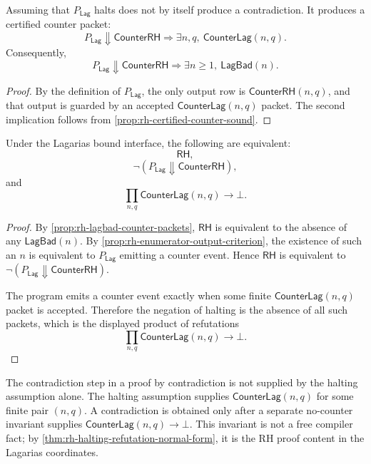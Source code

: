 \begin{proposition}
\label{prop:rh-halting-assumption-exposes-counter}
Assuming that $P_{\mathsf{Lag}}$ halts does not by itself produce a
contradiction.  It produces a certified counter packet:
$$
P_{\mathsf{Lag}}\Downarrow\mathsf{CounterRH}
\Longrightarrow
\exists n,q,\ \mathsf{CounterLag}(n,q).
$$
Consequently,
$$
P_{\mathsf{Lag}}\Downarrow\mathsf{CounterRH}
\Longrightarrow
\exists n\geq 1,\ \mathsf{LagBad}(n).
$$
\end{proposition}

\begin{proof}
By the definition of $P_{\mathsf{Lag}}$, the only output row is
$\mathsf{CounterRH}(n,q)$, and that output is guarded by an accepted
$\mathsf{CounterLag}(n,q)$ packet.  The second implication follows from
\autoref{prop:rh-certified-counter-sound}.
\end{proof}

\begin{theorem}
\label{thm:rh-halting-refutation-normal-form}
Under the Lagarias bound interface, the following are equivalent:
$$
\mathsf{RH},
$$
$$
\neg(P_{\mathsf{Lag}}\Downarrow\mathsf{CounterRH}),
$$
and
$$
\prod_{n,q}\mathsf{CounterLag}(n,q)\to\bot.
$$
\end{theorem}

\begin{proof}
By \autoref{prop:rh-lagbad-counter-packets}, $\mathsf{RH}$ is equivalent to
the absence of any $\mathsf{LagBad}(n)$.  By
\autoref{prop:rh-enumerator-output-criterion}, the existence of such an
$n$ is equivalent to $P_{\mathsf{Lag}}$ emitting a counter event.  Hence
$\mathsf{RH}$ is equivalent to
$\neg(P_{\mathsf{Lag}}\Downarrow\mathsf{CounterRH})$.

The program emits a counter event exactly when some finite
$\mathsf{CounterLag}(n,q)$ packet is accepted.  Therefore the negation of
halting is the absence of all such packets, which is the displayed product
of refutations
$$
\prod_{n,q}\mathsf{CounterLag}(n,q)\to\bot.
$$
\end{proof}

\begin{remark}
\label{rem:rh-role-of-contradiction}
The contradiction step in a proof by contradiction is not supplied by the
halting assumption alone.  The halting assumption supplies
$\mathsf{CounterLag}(n,q)$ for some finite pair $(n,q)$.  A contradiction is
obtained only after a separate no-counter invariant supplies
$\mathsf{CounterLag}(n,q)\to\bot$.  This invariant is not a free compiler
fact; by \autoref{thm:rh-halting-refutation-normal-form}, it is the RH
proof content in the Lagarias coordinates.
\end{remark}

